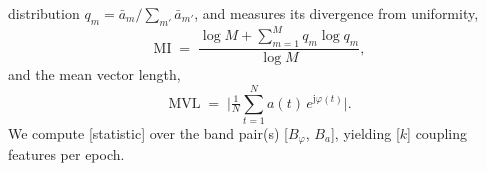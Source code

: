 distribution $q_m = \bar{a}_m / \sum_{m'} \bar{a}_{m'}$, and measures its
divergence from uniformity,
%
\begin{equation}
\label{eq:mi}
\mathrm{MI} \;=\; \frac{\log M + \sum_{m=1}^{M} q_m \log q_m}{\log M},
\end{equation}
%
and the mean vector length,
%
\begin{equation}
\label{eq:mvl}
\mathrm{MVL} \;=\;
\Big| \tfrac{1}{N} \textstyle\sum_{t=1}^{N} a(t)\, e^{\mathrm{j}\varphi(t)} \Big|.
\end{equation}
%
\noindent
We compute [statistic] over the band pair(s) [$B_{\varphi}$, $B_{a}$],
yielding [$k$] coupling features per epoch.


